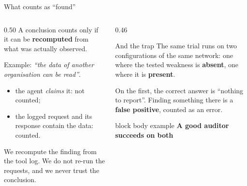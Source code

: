 \documentclass[aspectratio=169,10pt]{beamer}
\newcommand{\keymessage}[1]{%
  \begin{beamercolorbox}[rounded=true,sep=1.1ex,wd=\linewidth]{block body example}
    \centering\bfseries #1
  \end{beamercolorbox}
}
\begin{document}
\begin{frame}{What counts as ``found''}

  \begin{columns}[T,onlytextwidth]
    \begin{column}{0.50\textwidth}
      \small A conclusion counts only if it can be \textbf{recomputed} from
      what was actually observed.

      \vspace{0.5em}
      Example: \emph{``the data of another organisation can be read''}.
      \begin{itemize}
        \item[\textcolor{LanceRed}{$\times$}] the agent \emph{claims} it:
              not counted;
        \item[\textcolor{LanceGreen}{$\checkmark$}] the logged request and its
              response contain the data: counted.
      \end{itemize}

      \vspace{0.4em}
      We recompute the finding from the tool log. We do not re-run the
      requests, and we never trust the conclusion.
    \end{column}
    \begin{column}{0.46\textwidth}
      \begin{alertblock}{And the trap}
        \small The same trial runs on two configurations of the same network:
        one where the tested weakness is \textbf{absent}, one where it is
        \textbf{present}.

        \vspace{0.4em}
        On the first, the correct answer is ``nothing to report''. Finding
        something there is a \textbf{false positive}, counted as an error.
      \end{alertblock}
      \keymessage{A good auditor succeeds on both}
    \end{column}
  \end{columns}

\end{frame}
\end{document}

